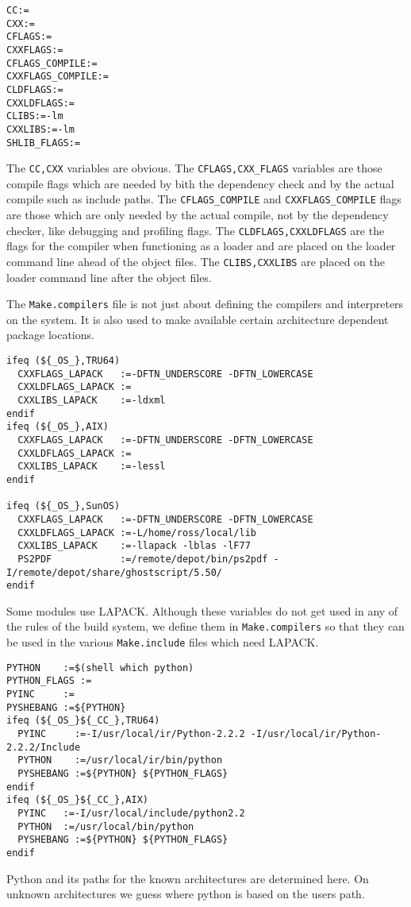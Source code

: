 \documentclass{article}
\begin{document}
\begin{verbatim}
CC:=
CXX:=
CFLAGS:=
CXXFLAGS:=
CFLAGS_COMPILE:=
CXXFLAGS_COMPILE:=
CLDFLAGS:=
CXXLDFLAGS:=
CLIBS:=-lm
CXXLIBS:=-lm
SHLIB_FLAGS:=
\end{verbatim}
The \verb+CC,CXX+ variables are obvious.  The \verb+CFLAGS,CXX_FLAGS+
variables are those compile flags which are needed by bith the
dependency check and by the actual compile such as
include paths.  The \verb+CFLAGS_COMPILE+
and \verb+CXXFLAGS_COMPILE+ flags are those which are only needed by
the actual compile, not by the dependency checker, like debugging
and profiling flags.  The \verb+CLDFLAGS,CXXLDFLAGS+ are the flags
for the compiler when functioning as a loader and are placed on
the loader command line ahead of the object files.  The
\verb+CLIBS,CXXLIBS+ are placed on the loader command line after the
object files.

The \verb+Make.compilers+ file is not just about defining the compilers
and interpreters on the system.  It is also used to make available certain
architecture dependent package locations.
\begin{verbatim}
ifeq (${_OS_},TRU64)
  CXXFLAGS_LAPACK   :=-DFTN_UNDERSCORE -DFTN_LOWERCASE
  CXXLDFLAGS_LAPACK :=
  CXXLIBS_LAPACK    :=-ldxml
endif
ifeq (${_OS_},AIX)
  CXXFLAGS_LAPACK   :=-DFTN_UNDERSCORE -DFTN_LOWERCASE
  CXXLDFLAGS_LAPACK :=
  CXXLIBS_LAPACK    :=-lessl
endif

ifeq (${_OS_},SunOS)
  CXXFLAGS_LAPACK   :=-DFTN_UNDERSCORE -DFTN_LOWERCASE
  CXXLDFLAGS_LAPACK :=-L/home/ross/local/lib
  CXXLIBS_LAPACK    :=-llapack -lblas -lF77
  PS2PDF            :=/remote/depot/bin/ps2pdf -I/remote/depot/share/ghostscript/5.50/
endif
\end{verbatim}
Some modules use LAPACK.  Although these variables do not get used
in any of the rules of the build system, we define them in 
\verb+Make.compilers+ so that they can be used in the various
\verb+Make.include+ files which need LAPACK.

\begin{verbatim}
PYTHON    :=$(shell which python)
PYTHON_FLAGS :=
PYINC     :=
PYSHEBANG :=${PYTHON}
ifeq (${_OS_}${_CC_},TRU64)
  PYINC     :=-I/usr/local/ir/Python-2.2.2 -I/usr/local/ir/Python-2.2.2/Include
  PYTHON    :=/usr/local/ir/bin/python
  PYSHEBANG :=${PYTHON} ${PYTHON_FLAGS}
endif
ifeq (${_OS_}${_CC_},AIX)
  PYINC   :=-I/usr/local/include/python2.2
  PYTHON  :=/usr/local/bin/python
  PYSHEBANG :=${PYTHON} ${PYTHON_FLAGS}
endif
\end{verbatim}
Python and its paths for the known architectures are determined here.  On
unknown architectures we guess where python is based on the users path.
\end{document}
